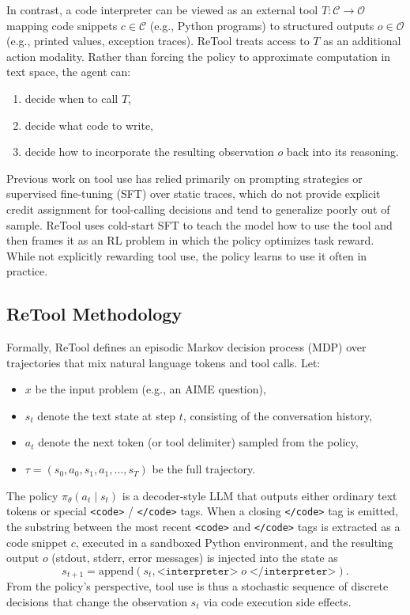 \documentclass{article}
\begin{document}
In contrast, a code interpreter can be viewed as an external tool 
$T: \mathcal{C} \rightarrow \mathcal{O}$ mapping code snippets $c \in \mathcal{C}$ 
(e.g., Python programs) to structured outputs $o \in \mathcal{O}$ 
(e.g., printed values, exception traces). ReTool treats access to $T$ as an 
additional action modality. Rather than forcing the policy to approximate 
computation in text space, the agent can:
\begin{enumerate}
  \item decide when to call $T$,
  \item decide what code to write,
  \item decide how to incorporate the resulting observation $o$ back into its reasoning.
\end{enumerate}
Previous work on tool use has relied primarily on prompting strategies or 
supervised fine-tuning (SFT) over static traces, which do not provide explicit 
credit assignment for tool-calling decisions and tend to generalize poorly out of
sample. ReTool uses cold-start SFT to teach the model how to use the tool and then frames it as an RL problem in which the 
policy optimizes task reward. While not explicitly rewarding tool use, the policy learns to use it often in practice.

\subsection{ReTool Methodology}
Formally, ReTool defines an episodic Markov decision process (MDP) over 
trajectories that mix natural language tokens and tool calls. Let:
\begin{itemize}
  \item $x$ be the input problem (e.g., an AIME question),
  \item $s_t$ denote the text state at step $t$, consisting of the conversation history,
  \item $a_t$ denote the next token (or tool delimiter) sampled from the policy,
  \item $\tau = (s_0, a_0, s_1, a_1, \dots, s_T)$ be the full trajectory.
\end{itemize}
The policy $\pi_\theta(a_t \mid s_t)$ is a decoder-style LLM that outputs either 
ordinary text tokens or special \texttt{<code>} / \texttt{</code>} tags. When a 
closing \texttt{</code>} tag is emitted, the substring between the most recent 
\texttt{<code>} and \texttt{</code>} tags is extracted as a code snippet $c$, 
executed in a sandboxed Python environment, and the resulting output $o$ (stdout, 
stderr, error messages) is injected into the state as
\begin{equation}
  s_{t+1} = \mathrm{append}(s_t, \texttt{<interpreter>} \; o \; \texttt{</interpreter>}).
\end{equation}
From the policy’s perspective, tool use is thus a stochastic sequence of discrete 
decisions that change the observation $s_t$ via code execution side effects.
\end{document}
